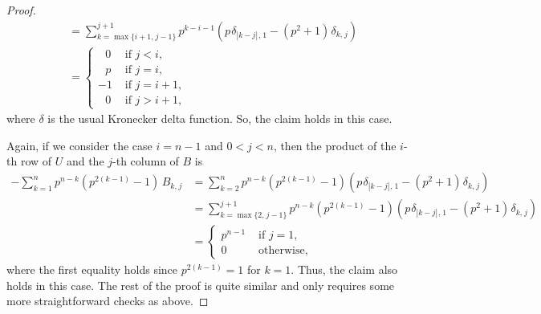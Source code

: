 \documentclass[a4paper,11pt]{amsart}
\begin{document}
\begin{proof}
\begin{align*}
&=\sum_{k=\max\{i+1,\hspace{1pt}j-1\}}^{j+1}p^{k-i-1}(p\hspace{1pt}\delta_{|k-j|\hspace{1pt},\hspace{1pt}1}-(p^2+1)\hspace{1pt}\delta_{k,\hspace{1pt}j})\\
&=\left\{\begin{array}{ll}
\hspace{8pt}0&\text{ if $j<i$,}\\
\hspace{8pt}p&\text{ if $j=i$,}\\
-1&\text{ if $j=i+1$,}\\
\hspace{8pt}0&\text{ if $j>i+1$,}
\end{array}\right.
\end{align*}
where $\delta$ is the usual Kronecker delta function. So, the claim holds in this case.

Again, if we consider the case $i=n-1$ and $0<j<n$, then the product of the $i$-th row of $U$
and the $j$-th column of $B$ is \begin{align*}-\sum_{k=1}^np^{n-k}\left(p^{2(k-1)}-1\right)\hspace{2pt}B_{k,\hspace{1pt}j}&=\sum_{k=2}^np^{n-k}\left(p^{2(k-1)}-1\right)\left(p\hspace{1pt}\delta_{|k-j|\hspace{1pt},\hspace{1pt}1}-(p^2+1)\hspace{1pt}\delta_{k,\hspace{1pt}j}\right)\\
&=\sum_{k=\max\{2,\hspace{1pt}j-1\}}^{j+1}p^{n-k}\left(p^{2(k-1)}-1\right)\left(p\hspace{1pt}\delta_{|k-j|\hspace{1pt},\hspace{1pt}1}-(p^2+1)\hspace{1pt}\delta_{k,\hspace{1pt}j}\right)\\
&=\left\{\begin{array}{ll}
p^{n-1}&\text{ if $j=1$,}\\
0&\text{ otherwise,}
\end{array}\right.
\end{align*}
where the first equality holds since $p^{2(k-1)}=1$ for $k=1$. Thus, the claim also holds in this case.
The rest of the proof is quite similar and only requires some more straightforward checks as above.
\end{proof}


\nocite{*}
\end{document}
